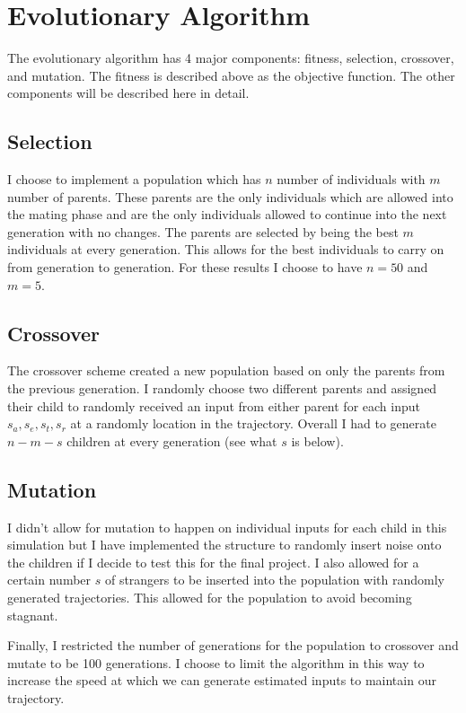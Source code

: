 \documentclass{article}
\begin{document}
\section*{Evolutionary Algorithm}

The evolutionary algorithm has 4 major components: fitness, selection, crossover, and mutation. The fitness is described above as the objective function. The other components will be described here in detail.

\subsection*{Selection}

I choose to implement a population which has $n$ number of individuals with $m$ number of parents. These parents are the only individuals which are allowed into the mating phase and are the only individuals allowed to continue into the next generation with no changes. The parents are selected by being the best $m$ individuals at every generation. This allows for the best individuals to carry on from generation to generation. For these results I choose to have $n=50$ and $m=5$.

\subsection*{Crossover}

The crossover scheme created a new population based on only the parents from the previous generation. I randomly choose two different parents and assigned their child to randomly received an input from either parent for each input $s_{a}, s_{e}, s_{t}, s_{r}$ at a randomly location in the trajectory. Overall I had to generate $n-m-s$ children at every generation (see what $s$ is below).

\subsection*{Mutation}

I didn't allow for mutation to happen on individual inputs for each child in this simulation but I have implemented the structure to randomly insert noise onto the children if I decide to test this for the final project. I also allowed for a certain number $s$ of strangers to be inserted into the population with randomly generated trajectories. This allowed for the population to avoid becoming stagnant. 

Finally, I restricted the number of generations for the population to crossover and mutate to be 100 generations. I choose to limit the algorithm in this way to increase the speed at which we can generate estimated inputs to maintain our trajectory.
\end{document}
